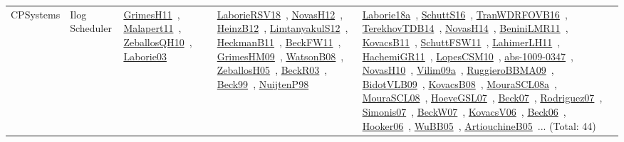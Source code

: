 {\begin{longtable}{lp{3cm}>{\raggedright\arraybackslash}p{6cm}>{\raggedright\arraybackslash}p{6cm}>{\raggedright\arraybackslash}p{8cm}}
CPSystems & Ilog Scheduler & \href{works/GrimesH11.pdf}{GrimesH11}~\cite{GrimesH11}, \href{works/Malapert11.pdf}{Malapert11}~\cite{Malapert11}, \href{works/ZeballosQH10.pdf}{ZeballosQH10}~\cite{ZeballosQH10}, \href{works/Laborie03.pdf}{Laborie03}~\cite{Laborie03} & \href{works/LaborieRSV18.pdf}{LaborieRSV18}~\cite{LaborieRSV18}, \href{works/NovasH12.pdf}{NovasH12}~\cite{NovasH12}, \href{works/HeinzB12.pdf}{HeinzB12}~\cite{HeinzB12}, \href{works/LimtanyakulS12.pdf}{LimtanyakulS12}~\cite{LimtanyakulS12}, \href{works/HeckmanB11.pdf}{HeckmanB11}~\cite{HeckmanB11}, \href{works/BeckFW11.pdf}{BeckFW11}~\cite{BeckFW11}, \href{works/GrimesHM09.pdf}{GrimesHM09}~\cite{GrimesHM09}, \href{works/WatsonB08.pdf}{WatsonB08}~\cite{WatsonB08}, \href{works/ZeballosH05.pdf}{ZeballosH05}~\cite{ZeballosH05}, \href{works/BeckR03.pdf}{BeckR03}~\cite{BeckR03}, \href{works/Beck99.pdf}{Beck99}~\cite{Beck99}, \href{works/NuijtenP98.pdf}{NuijtenP98}~\cite{NuijtenP98} & \href{works/Laborie18a.pdf}{Laborie18a}~\cite{Laborie18a}, \href{works/SchuttS16.pdf}{SchuttS16}~\cite{SchuttS16}, \href{works/TranWDRFOVB16.pdf}{TranWDRFOVB16}~\cite{TranWDRFOVB16}, \href{works/TerekhovTDB14.pdf}{TerekhovTDB14}~\cite{TerekhovTDB14}, \href{works/NovasH14.pdf}{NovasH14}~\cite{NovasH14}, \href{works/BeniniLMR11.pdf}{BeniniLMR11}~\cite{BeniniLMR11}, \href{works/KovacsB11.pdf}{KovacsB11}~\cite{KovacsB11}, \href{works/SchuttFSW11.pdf}{SchuttFSW11}~\cite{SchuttFSW11}, \href{works/LahimerLH11.pdf}{LahimerLH11}~\cite{LahimerLH11}, \href{works/HachemiGR11.pdf}{HachemiGR11}~\cite{HachemiGR11}, \href{works/LopesCSM10.pdf}{LopesCSM10}~\cite{LopesCSM10}, \href{works/abs-1009-0347.pdf}{abs-1009-0347}~\cite{abs-1009-0347}, \href{works/NovasH10.pdf}{NovasH10}~\cite{NovasH10}, \href{works/Vilim09a.pdf}{Vilim09a}~\cite{Vilim09a}, \href{works/RuggieroBBMA09.pdf}{RuggieroBBMA09}~\cite{RuggieroBBMA09}, \href{works/BidotVLB09.pdf}{BidotVLB09}~\cite{BidotVLB09}, \href{works/KovacsB08.pdf}{KovacsB08}~\cite{KovacsB08}, \href{works/MouraSCL08a.pdf}{MouraSCL08a}~\cite{MouraSCL08a}, \href{works/MouraSCL08.pdf}{MouraSCL08}~\cite{MouraSCL08}, \href{works/HoeveGSL07.pdf}{HoeveGSL07}~\cite{HoeveGSL07}, \href{works/Beck07.pdf}{Beck07}~\cite{Beck07}, \href{works/Rodriguez07.pdf}{Rodriguez07}~\cite{Rodriguez07}, \href{works/Simonis07.pdf}{Simonis07}~\cite{Simonis07}, \href{works/BeckW07.pdf}{BeckW07}~\cite{BeckW07}, \href{works/KovacsV06.pdf}{KovacsV06}~\cite{KovacsV06}, \href{works/Beck06.pdf}{Beck06}~\cite{Beck06}, \href{works/Hooker06.pdf}{Hooker06}~\cite{Hooker06}, \href{works/WuBB05.pdf}{WuBB05}~\cite{WuBB05}, \href{works/ArtiouchineB05.pdf}{ArtiouchineB05}~\cite{ArtiouchineB05}... (Total: 44)\\

\end{longtable}}
